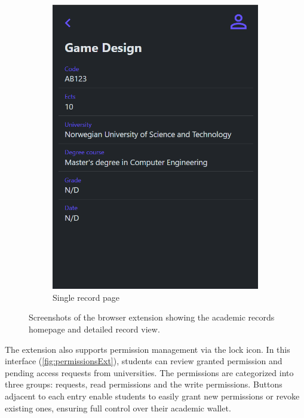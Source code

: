 \begin{figure}
\begin{subfigure}{.45\textwidth}
        \includegraphics[width=\textwidth]{figures/SingleCourse.png}
        \caption{Single record page}
        \label{sfig:singleRecordExt}
    \end{subfigure}
    \caption[Browser extension windows for academical records]{Screenshots of the browser extension showing the academic records homepage and detailed record view.}
    \label{fig:recordsExt}
\end{figure}

The extension also supports permission management via the lock icon. In this interface (\cref{fig:permissionsExt}), students can review granted permission and pending access requests from universities. The permissions are categorized into three groups: requests, read permissions and the write permissions. Buttons adjacent to each entry enable students to easily grant new permissions or revoke existing ones, ensuring full control over their academic wallet.

